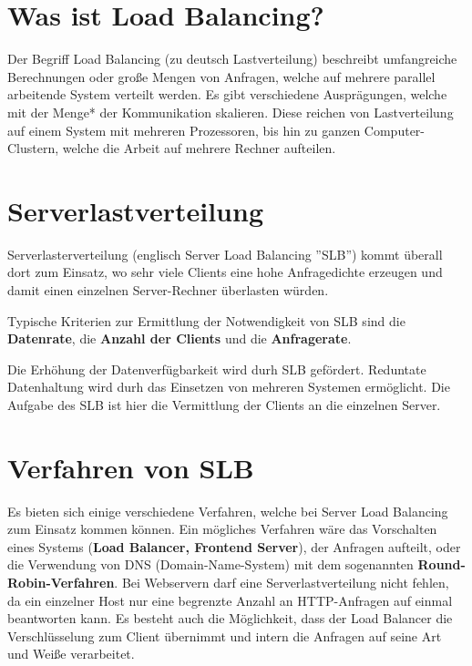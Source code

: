 


\section{Was ist Load Balancing?}\cite{Lastverteilung}
Der Begriff Load Balancing (zu deutsch Lastverteilung) beschreibt umfangreiche Berechnungen oder große Mengen von Anfragen, welche auf mehrere parallel arbeitende System verteilt werden. Es gibt verschiedene Ausprägungen, welche mit der Menge* der Kommunikation skalieren. Diese reichen von
Lastverteilung auf einem System mit mehreren Prozessoren, bis hin zu ganzen Computer-Clustern, welche die Arbeit auf mehrere Rechner aufteilen.

\section{Serverlastverteilung}

Serverlasterverteilung (englisch Server Load Balancing ''SLB'') kommt überall dort zum Einsatz, wo sehr viele Clients eine hohe Anfragedichte erzeugen und damit einen einzelnen Server-Rechner überlasten würden.\newline

Typische Kriterien zur Ermittlung der Notwendigkeit von SLB sind die \textbf{Datenrate}, die \textbf{Anzahl der Clients} und die \textbf{Anfragerate}. \newline

Die Erhöhung der Datenverfügbarkeit wird durh SLB gefördert. Reduntate Datenhaltung wird durh das Einsetzen von mehreren Systemen ermöglicht. Die Aufgabe des SLB ist hier die Vermittlung der Clients an die einzelnen Server. \newline

\section{Verfahren von SLB}
Es bieten sich einige verschiedene Verfahren, welche bei Server Load Balancing zum Einsatz kommen können. Ein mögliches Verfahren wäre das Vorschalten eines Systems (\textbf{Load Balancer, Frontend Server}), der Anfragen aufteilt, oder die Verwendung von DNS (Domain-Name-System) mit dem sogenannten \textbf{Round-Robin-Verfahren}. Bei Webservern darf eine Serverlastverteilung nicht fehlen, da ein einzelner Host nur eine begrenzte Anzahl an HTTP-Anfragen auf einmal beantworten kann. Es besteht auch die Möglichkeit, dass der Load Balancer die Verschlüsselung zum Client übernimmt und intern die Anfragen auf seine Art und Weiße verarbeitet. \newline

